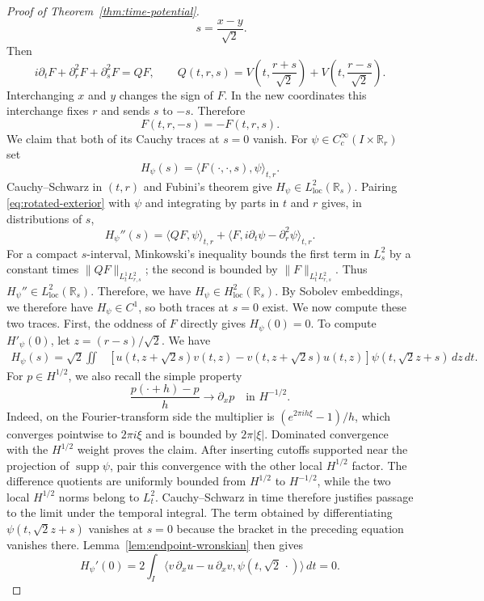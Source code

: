 \documentclass[11pt]{amsart}
\theoremstyle{remark}
\newcommand{\R}{\mathbb R}
\newcommand{\supp}{\operatorname{supp}}
\newcommand{\1}{\mathbf 1}
\newcommand{\loc}{\mathrm{loc}}
\begin{document}
\begin{proof}[Proof of Theorem~\ref{thm:time-potential}]
\[ \qquad s=\frac{x-y}{\sqrt2}.
\]
Then
\[
 i\partial_tF+\partial_r^2F+\partial_s^2F=QF,
 \qquad
 Q(t,r,s)=V\!\left(t,\frac{r+s}{\sqrt2}\right)
          +V\!\left(t,\frac{r-s}{\sqrt2}\right).
 \tag{1.12}\label{eq:rotated-exterior}
\]
Interchanging $x$ and $y$ changes the sign of $F$.  In the new coordinates
this interchange fixes $r$ and sends $s$ to $-s$.  Therefore
\[
 F(t,r,-s)=-F(t,r,s).
\]
We claim that both of its Cauchy traces at $s=0$ vanish.  For $\psi\in C_c^\infty(I\times\R_r)$ set
\[
 H_\psi(s)=\langle F(\cdot,\cdot,s),\psi\rangle_{t,r}.
\]
Cauchy--Schwarz in $(t,r)$ and Fubini's theorem give
$H_\psi\in L^2_{\loc}(\R_s)$.  Pairing
\eqref{eq:rotated-exterior} with $\psi$ and integrating by parts in $t$ and
$r$ gives, in distributions of $s$,
\[
 H_\psi''(s)
 =\langle QF,\psi\rangle_{t,r}
 +\langle F,i\partial_t\psi-\partial_r^2\psi\rangle_{t,r}.
 \tag{1.12a}\label{eq:scalar-trace-equation}
\]
For a compact $s$-interval, Minkowski's inequality bounds the first term in
$L^2_s$ by a constant times $\|QF\|_{L^1_tL^2_{r,s}}$; the second is bounded
by $\|F\|_{L^1_tL^2_{r,s}}$.  Thus $H_\psi''\in L^2_{\loc}(\R_s)$.  Therefore, we have
$H_\psi\in H^2_{\loc}(\R_s)$. By Sobolev embeddings, we therefore have $H_{\psi}\in C^1$, so both traces at $s=0$ exist. We now compute these two traces. First, the oddness of $F$ directly gives
$H_\psi(0)=0$. To compute $H'_{\psi}(0)$, let $z=(r-s)/\sqrt2$. We have
\begin{align*}
 H_\psi(s)=\sqrt2\iint
 &[u(t,z+\sqrt2s)v(t,z)-v(t,z+\sqrt2s)u(t,z)]\psi(t,\sqrt2z+s)\,dz\,dt.
\end{align*}
For $p\in H^{1/2}$, we also recall the simple property
\[
 \frac{p(\cdot+h)-p}{h}\longrightarrow \partial_xp
 \quad\text{in }H^{-1/2}.
\]
Indeed, on the Fourier-transform side the multiplier is
$(e^{2\pi ih\xi}-1)/h$, which converges pointwise to $2\pi i\xi$ and is bounded by
$2\pi|\xi|$.  Dominated convergence with the $H^{1/2}$ weight proves the claim.
After inserting cutoffs supported near the projection of $\supp\psi$, pair
this convergence with the other local $H^{1/2}$ factor.  The difference
quotients are uniformly bounded from $H^{1/2}$ to $H^{-1/2}$, while the two
local $H^{1/2}$ norms belong to $L^2_t$.  Cauchy--Schwarz in time therefore
justifies passage to the limit under the temporal integral.  The term obtained by
differentiating $\psi(t,\sqrt2z+s)$ vanishes at $s=0$ because the bracket in
the preceding equation vanishes there.  Lemma~\ref{lem:endpoint-wronskian}
then gives
\[
 H_\psi'(0)=2\int_I
 \bigl\langle v\,\partial_xu-u\,\partial_xv,
 \psi(t,\sqrt2\,\cdot)\bigr\rangle\,dt=0.
\]
\end{proof}
\end{document}
